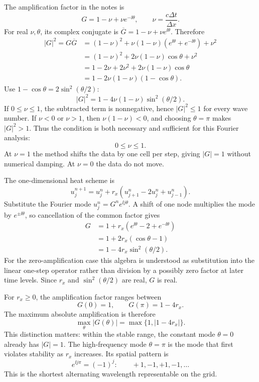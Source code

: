 The amplification factor in the notes is
\[
G=1-\nu+\nu e^{-\ii\theta},\qquad \nu=\frac{c\Delta t}{\Delta x}.
\]
For real $\nu,\theta$, its complex conjugate is
$\overline G=1-\nu+\nu e^{\ii\theta}$. Therefore
\begin{align*}
|G|^2=G\overline G
&=(1-\nu)^2+\nu(1-\nu)(e^{\ii\theta}+e^{-\ii\theta})+\nu^2\\
&=(1-\nu)^2+2\nu(1-\nu)\cos\theta+\nu^2\\
&=1-2\nu+2\nu^2+2\nu(1-\nu)\cos\theta\\
&=1-2\nu(1-\nu)(1-\cos\theta).
\end{align*}
Use $1-\cos\theta=2\sin^2(\theta/2)$:
\[
\boxed{|G|^2=1-4\nu(1-\nu)\sin^2(\theta/2).}
\]
If $0\le\nu\le1$, the subtracted term is nonnegative, hence $|G|^2\le1$ for every wave number.
If $\nu<0$ or $\nu>1$, then $\nu(1-\nu)<0$, and choosing $\theta=\pi$ makes $|G|^2>1$.
Thus the condition is both necessary and sufficient for this Fourier analysis:
\[
\boxed{0\le\nu\le1.}
\]
At $\nu=1$ the method shifts the data by one cell per step, giving $|G|=1$ without numerical
damping. At $\nu=0$ the data do not move.

The one-dimensional heat scheme is
\[
u_j^{n+1}=u_j^n+r_x(u_{j+1}^n-2u_j^n+u_{j-1}^n).
\]
Substitute the Fourier mode $u_j^n=G^ne^{\ii j\theta}$.
A shift of one node multiplies the mode by $e^{\pm\ii\theta}$, so cancellation of the common
factor gives
\begin{align*}
G&=1+r_x(e^{\ii\theta}-2+e^{-\ii\theta})\\
&=1+2r_x(\cos\theta-1)\\
&=\boxed{1-4r_x\sin^2(\theta/2).}
\end{align*}
For the zero-amplification case this algebra is understood as substitution into the linear
one-step operator rather than division by a possibly zero factor at later time levels.
Since $r_x$ and $\sin^2(\theta/2)$ are real, $G$ is real.

For $r_x\ge0$, the amplification factor ranges between
\[
G(0)=1,\qquad G(\pi)=1-4r_x.
\]
The maximum absolute amplification is therefore
\[
\boxed{\max_\theta|G(\theta)|=\max\{1,|1-4r_x|\}.}
\]
This distinction matters: within the stable range, the constant mode $\theta=0$ already has
$|G|=1$. The high-frequency mode $\theta=\pi$ is the mode that first violates stability as
$r_x$ increases. Its spatial pattern is
\[
e^{\ii j\pi}=(-1)^j:\qquad +1,-1,+1,-1,\ldots
\]
This is the shortest alternating wavelength representable on the grid.

